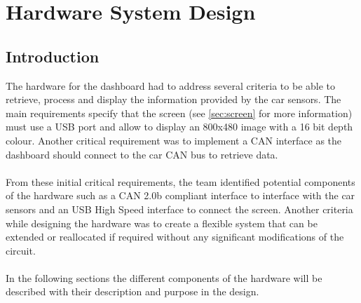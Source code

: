 \documentclass[11pt]{report} %
\begin{document}
\chapter{Hardware System Design}
	\section{Introduction}
	The hardware for the dashboard had to address several criteria to be 
	able to
	retrieve, process and display the information provided by the car sensors. 
	The
	main requirements specify that the screen (see \ref{sec:screen} for more
	information) must use a USB port and allow to display an 800x480 image with
	a 16 bit depth colour. Another critical requirement was to implement a CAN
	interface as the dashboard should connect to the car CAN bus to retrieve 
	data.\\
	\\
	From these initial critical requirements, the team identified potential
	components of the hardware such as a CAN 2.0b compliant interface to 
	interface
	with the car sensors and an USB High Speed interface to connect the screen.
	Another criteria while designing the hardware was to create a flexible 
	system
	that can be extended or reallocated if required without any significant
	modifications of the circuit.\\
	\\
	In the following sections the different components of the hardware will be
	described with their description and purpose in the design.
\end{document}
